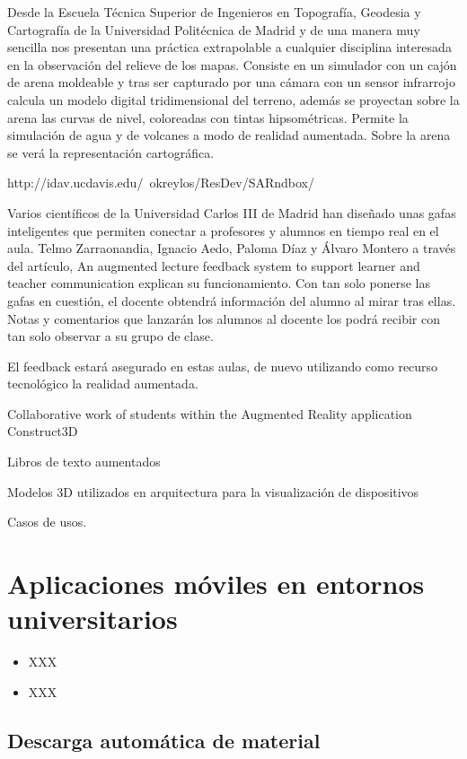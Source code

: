 Desde la Escuela Técnica Superior de Ingenieros en Topografía, Geodesia y Cartografía de la Universidad Politécnica de Madrid y de una manera muy sencilla nos presentan una práctica extrapolable a cualquier disciplina interesada en la observación del relieve de los mapas. Consiste en un simulador con un cajón de arena moldeable y tras ser capturado por una cámara con un sensor infrarrojo calcula un modelo digital tridimensional del terreno, además se proyectan sobre la arena las curvas de nivel, coloreadas con tintas hipsométricas. Permite la simulación de agua y de volcanes a modo de realidad aumentada. Sobre la arena se verá la representación cartográfica.

http://idav.ucdavis.edu/~okreylos/ResDev/SARndbox/



Varios científicos de la Universidad Carlos III de Madrid han diseñado unas gafas inteligentes que permiten conectar a profesores y alumnos en tiempo real en el aula. Telmo Zarraonandia, Ignacio Aedo, Paloma Díaz y Álvaro Montero a través del artículo, An augmented lecture feedback system to support learner and teacher communication explican su funcionamiento. Con tan solo ponerse las gafas en cuestión, el docente obtendrá información del alumno al mirar tras ellas. Notas y comentarios que lanzarán los alumnos al docente los podrá recibir con tan solo observar a su grupo de clase.

El feedback estará asegurado en estas aulas, de nuevo utilizando como recurso tecnológico la realidad aumentada.





Collaborative work of students within the
Augmented Reality application Construct3D

Libros de texto aumentados 



Modelos 3D utilizados en arquitectura para la visualización de dispositivos







Casos de usos. 
 
\section{Aplicaciones móviles en entornos universitarios}


\begin{itemize}
\item XXX
\item XXX
\end{itemize}



\subsection{Descarga automática de material} \label{sec:descargaautomatica}




